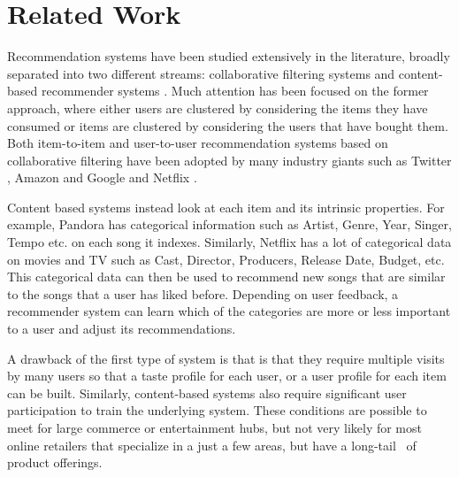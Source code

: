 \section{Related Work}

Recommendation systems have been studied extensively in the literature, %
broadly separated into two different streams: collaborative filtering systems and content-based recommender systems \cite{almazro2010survey}. Much attention has been focused on the former approach, where either users are clustered by considering the items they have consumed or items are clustered by considering the users that have bought them. Both item-to-item and user-to-user recommendation systems based on collaborative filtering have been adopted by many industry giants such as Twitter \cite{twitter-collab-filtering}, Amazon \cite{amazon-collab-filtering} and Google \cite{google-collab-filtering} and Netflix \cite{bellbellkor}.  \vs

Content based systems instead look at each item and its intrinsic properties. For example, Pandora has categorical information such as Artist, Genre, Year, Singer, Tempo etc. on each song it indexes. Similarly, Netflix has a lot of categorical data on movies and TV such as Cast, Director, Producers, Release Date, Budget, etc. This categorical data can then be used to recommend new songs that are similar to the songs that a user has liked before. Depending on user feedback, a recommender system can learn which of the categories are more or less important to a user and adjust its recommendations. \vs

A drawback of the first type of system is that is that they require multiple visits by many users so that a taste profile for each user, or a user profile for each item can be built.
Similarly, content-based systems also require significant user participation to train the underlying system. These conditions are possible to meet for large commerce or entertainment hubs,
but not very likely for most online retailers that specialize in a just a few areas, but have a long-tail~\cite{Anderson2006} of product offerings. \vs

